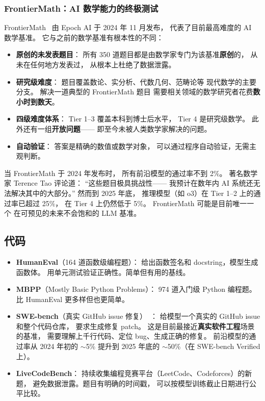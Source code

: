 \subsubsection{FrontierMath：AI 数学能力的终极测试}

FrontierMath~\cite{glazer2024frontiermath}
由 Epoch AI 于 2024 年 11 月发布，
代表了目前最高难度的 AI 数学基准。
它与之前的数学基准有根本性的不同：

\begin{itemize}[noitemsep]
  \item \textbf{原创的未发表题目}：
        所有 350 道题目都是由数学家专门为该基准\textbf{原创}的，
        从未在任何地方发表过，
        从根本上杜绝了数据泄露。
  \item \textbf{研究级难度}：
        题目覆盖数论、实分析、代数几何、范畴论等
        现代数学的主要分支。
        解决一道典型的 FrontierMath 题目
        需要相关领域的数学研究者花费\textbf{数小时到数天}。
  \item \textbf{四级难度体系}：
        Tier 1--3 覆盖本科到博士后水平，
        Tier 4 是研究级数学。
        此外还有一组\textbf{开放问题}——
        即至今未被人类数学家解决的问题。
  \item \textbf{自动验证}：
        答案是精确的数值或数学对象，
        可以通过程序自动验证，无需主观判断。
\end{itemize}

\begin{keybox}
当 FrontierMath 于 2024 年发布时，
所有前沿模型的通过率不到 2\%。
著名数学家 Terence Tao 评论道：
“这些题目极具挑战性——
我预计在数年内 AI 系统还无法解决其中的大部分。”
然而到 2025 年底，
推理模型（如 o3）在 Tier 1--2 上的通过率已超过 25\%，
在 Tier 4 上仍然低于 5\%。
FrontierMath 可能是目前唯一一个
在可预见的未来不会饱和的 LLM 基准。
\end{keybox}

\subsection{代码}
\begin{itemize}[noitemsep]
  \item \textbf{HumanEval}（164 道函数级编程题）：
        给出函数签名和 docstring，模型生成函数体。
        用单元测试验证正确性。简单但有用的基线。
  \item \textbf{MBPP}（Mostly Basic Python Problems）：
        974 道入门级 Python 编程题。比 HumanEval 更多样但也更简单。
  \item \textbf{SWE-bench}（真实 GitHub issue 修复）~\cite{jimenez2024swebench}：
        给模型一个真实的 GitHub issue 和整个代码仓库，
        要求生成修复 patch。
        这是目前最接近\textbf{真实软件工程}场景的基准，
        需要理解上千行代码、定位 bug、生成正确的修复。
        前沿模型的通过率从 2024 年初的 $\sim$5\%
        提升到 2025 年底的 $\sim$50\%（在 SWE-bench Verified 上）。
  \item \textbf{LiveCodeBench}：
        持续收集编程竞赛平台（LeetCode、Codeforces）的新题，
        避免数据泄露。题目有明确的时间戳，
        可以按模型训练截止日期进行公平比较。
\end{itemize}

